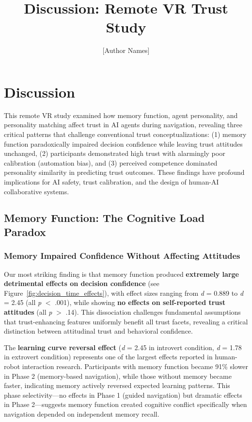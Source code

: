 \documentclass[12pt]{article}
\title{\textbf{Discussion: Remote VR Trust Study}}
\author{[Author Names]}
\date{}
\begin{document}
\maketitle

\section{Discussion}

This remote VR study examined how memory function, agent personality, and personality matching affect trust in AI agents during navigation, revealing three critical patterns that challenge conventional trust conceptualizations: (1) memory function paradoxically impaired decision confidence while leaving trust attitudes unchanged, (2) participants demonstrated high trust with alarmingly poor calibration (automation bias), and (3) perceived competence dominated personality similarity in predicting trust outcomes. These findings have profound implications for AI safety, trust calibration, and the design of human-AI collaborative systems.

\subsection{Memory Function: The Cognitive Load Paradox}

\subsubsection{Memory Impaired Confidence Without Affecting Attitudes}

Our most striking finding is that memory function produced \textbf{extremely large detrimental effects on decision confidence} (see Figure~\ref{fig:decision_time_effects}), with effect sizes ranging from \textit{d} = 0.889 to \textit{d} = 2.45 (all \textit{p} $<$ .001), while showing \textbf{no effects on self-reported trust attitudes} (all \textit{p} $>$ .14). This dissociation challenges fundamental assumptions that trust-enhancing features uniformly benefit all trust facets, revealing a critical distinction between attitudinal trust and behavioral confidence.

The \textbf{learning curve reversal effect} (\textit{d} = 2.45 in introvert condition, \textit{d} = 1.78 in extrovert condition) represents one of the largest effects reported in human-robot interaction research. Participants with memory function became 91\% slower in Phase 2 (memory-based navigation), while those without memory became faster, indicating memory actively reversed expected learning patterns. This phase selectivity—no effects in Phase 1 (guided navigation) but dramatic effects in Phase 2—suggests memory function created cognitive conflict specifically when navigation depended on independent memory recall.
\end{document}
